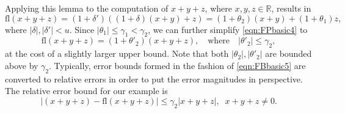 \documentclass[review,onefignum,onetabnum]{siamart190516}
\newcommand{\R}{\mathbb{R}}
\newcommand{\dd}{\delta}
\newcommand{\tth}{\theta}
\newcommand{\fl}{\mathrm{fl}}
\begin{document}
Applying this lemma to the computation of $x+y+z$, where $x,y,z\in\R$, results in
\begin{equation}
\fl(x+y+z) = (1+\dd')\left((1+\dd) (x+y) +z\right) = (1+\tth_{2})(x+y) + (1+\tth_{1})z, \label{eqn:FPbasic4}
\end{equation}
where $|\dd|,|\dd'|<u$. 
Since $|\tth_{1}| \leq \gamma_{1} < \gamma_{2}$, we can further simplify \cref{eqn:FPbasic4} to
\begin{equation}
\fl(x+y+z) = (1+\tth'_{2})(x+y+z), \quad \mbox{where} \quad |\tth'_{2}| \leq \gamma_{2}, \label{eqn:FBbasic5}
\end{equation}
at the cost of a slightly larger upper bound. 
Note that both $|\tth_2|,|\tth'_2|$ are bounded above by $\gamma_2$.
Typically, error bounds formed in the fashion of \cref{eqn:FBbasic5} are converted to relative errors in order to put the error magnitudes in perspective.
The relative error bound for our example is
\begin{equation*}
|(x+y+z) - \fl(x+y+z)|\leq \gamma_{2}|x+y+z|,\;\; x+y+z\neq 0.
\end{equation*}
\end{document}
